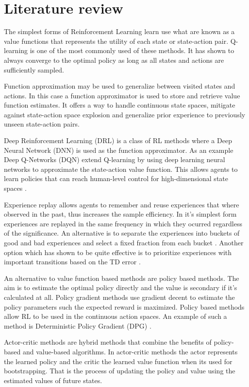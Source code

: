 \section{Literature review}
The simplest forms of Reinforcement Learning learn use what are known as a value functions that represents the utility of each state or state-action pair. Q-learning is one of the most commonly used of these methods. It has shown to always converge to the optimal policy as long as all states and actions are sufficiently sampled. \cite{watkins1992q}

Function approximation may be used to generalize between visited states and actions. In this case a function approximator is used to store and retrieve value function estimates. It offers a way to handle continuous state spaces, mitigate against state-action space explosion and generalize prior experience to previously unseen state-action pairs.

Deep Reinforcement Learning (DRL) is a class of RL methods where a Deep Neural Network (DNN) is used as the function approximator. As an example Deep Q-Networks (DQN) extend Q-learning by using deep learning neural networks to approximate the state-action value function. This allows agents to learn policies that can reach human-level control for high-dimensional state spaces \cite{mnih2015human}. 

Experience replay allows agents to remember and reuse experiences that where observed in the past, thus increases the sample efficiency. In it's simplest form experiences are replayed in the same frequency in which they ocurred regardless of the significance. An alternative is to separate the experiences into buckets of good and bad experiences and select a fixed fraction from each bucket \cite{narasimhan2015language}. Another option which has shown to be quite effective is to prioritize experiences with important transitions based on the TD error \cite{schaul2015prioritized}. 

An alternative to value function based methods are policy based methods. The aim is to estimate the optimal policy directly and the value is secondary if it's calculated at all. Policy gradient methods use gradient decent to estimate the policy parameters such the expected reward is maximized. Policy based methods allow RL to be used in the continuous action spaces. An example of such a method is Deterministic Policy Gradient (DPG) \cite{silver2014deterministic}. 

Actor-critic methods are hybrid methods that combine the benefits of policy-based and value-based algorithms. In actor-critic methods the actor represents the learned policy and the critic the learned value function when its used for bootstrapping. That is the process of updating the policy and value using the estimated values of future states.

